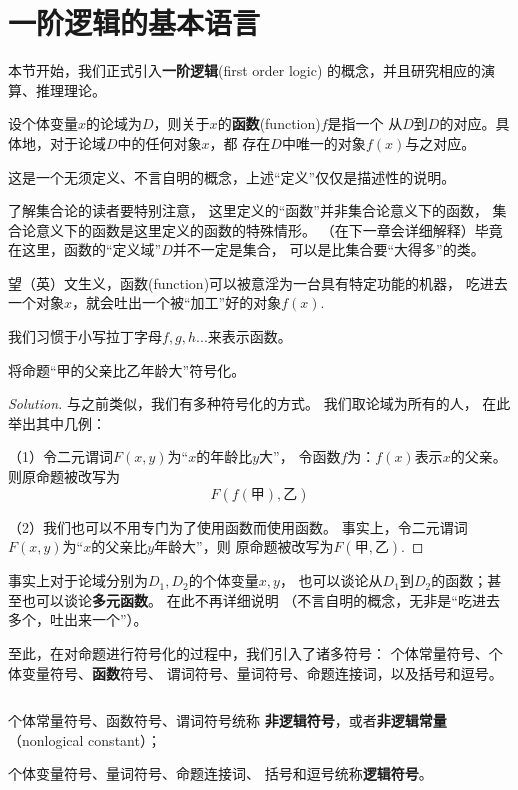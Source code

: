 \section{一阶逻辑的基本语言}

本节开始，我们正式引入\textbf{一阶逻辑}(first order logic)
的概念，并且研究相应的演算、推理理论。

\begin{definition}[函数与函数符号]
设个体变量$x$的论域为$D$，则关于$x$的\textbf{函数}(function)$f$是指一个
从$D$到$D$的对应。具体地，对于论域$D$中的任何对象$x$，都
存在$D$中唯一的对象$f(x)$与之对应。
\end{definition}

这是一个无须定义、不言自明的概念，上述“定义”仅仅是描述性的说明。

了解集合论的读者要特别注意，
这里定义的“函数”并非集合论意义下的函数，
集合论意义下的函数是这里定义的函数的特殊情形。
（在下一章会详细解释）毕竟在这里，函数的“定义域”$D$并不一定是集合，
可以是比集合要“大得多”的类。

望（英）文生义，函数(function)可以被意淫为一台具有特定功能的机器，
吃进去一个对象$x$，就会吐出一个被“加工”好的对象$f(x)$.

我们习惯于小写拉丁字母$f,g,h...$来表示函数。

\begin{example}
将命题“甲的父亲比乙年龄大”符号化。
\end{example}
\begin{proof}[Solution]
与之前类似，我们有多种符号化的方式。
我们取论域为所有的人，
在此举出其中几例：

（1）令二元谓词$F(x,y)$为“$x$的年龄比$y$大”，
令函数$f$为：$f(x)$表示$x$的父亲。
则原命题被改写为
$$F(f(\text{甲}),\text{乙})$$

（2）我们也可以不用专门为了使用函数而使用函数。
事实上，令二元谓词$F(x,y)$为“$x$的父亲比$y$年龄大”，则
原命题被改写为$F(\text{甲},\text{乙})$.
\end{proof}

事实上对于论域分别为$D_1,D_2$的个体变量$x,y$，
也可以谈论从$D_1$到$D_2$的函数；甚至也可以谈论\textbf{多元函数}。
在此不再详细说明
（不言自明的概念，无非是“吃进去多个，吐出来一个”）。\vs

至此，在对命题进行符号化的过程中，我们引入了诸多符号：
个体常量符号、个体变量符号、\textbf{函数}符号、
谓词符号、量词符号、命题连接词，以及括号和逗号。

\begin{definition}[逻辑符号与非逻辑符号]$\,$

个体常量符号、函数符号、谓词符号统称
\textbf{非逻辑符号}，或者\textbf{非逻辑常量}
（nonlogical constant）；

个体变量符号、量词符号、命题连接词、
括号和逗号统称\textbf{逻辑符号}。
\end{definition}

